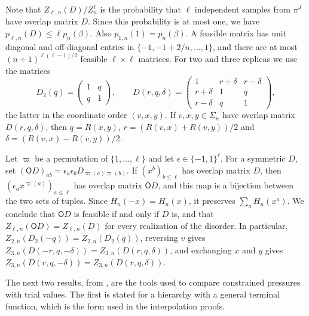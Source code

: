 Note that $Z_{\ell,n}(D)/Z_n^\ell$ is the probability that $\ell$ independent samples
from $\pi^J$ have overlap matrix $D$. Since this probability is at most one, we have
$p_{\ell,n}(D)\le\ell p_n(\beta)$. Also $p_{1,n}(1)=p_n(\beta)$. A feasible matrix has unit diagonal
and off-diagonal entries in $\{-1,-1+2/n,\dots,1\}$, and there are at most
$(n+1)^{\ell(\ell-1)/2}$ feasible $\ell\times\ell$ matrices. For two and three
replicas we use the matrices
\begin{equation}\label{eq:inp-triple}
 D_2(q)=\begin{pmatrix}1&q\\q&1\end{pmatrix},\qquad
 D(r,q,\delta)=\begin{pmatrix}1&r+\delta&r-\delta\\r+\delta&1&q\\r-\delta&q&1\end{pmatrix},
\end{equation}
the latter in the coordinate order $(v,x,y)$. If $v,x,y\in\Sigma_n$ have overlap
matrix $D(r,q,\delta)$, then $q=R(x,y)$, $r=(R(v,x)+R(v,y))/2$ and
$\delta=(R(v,x)-R(v,y))/2$.

\begin{remark}\label{rem:inp-orientation}
Let $\varpi$ be a permutation of $\{1,\dots,\ell\}$ and let
$\epsilon\in\{-1,1\}^\ell$. For a symmetric $D$, set
$(\mathsf O D)_{ab}=\epsilon_a\epsilon_bD_{\varpi(a)\varpi(b)}$. If $(x^b)_{b\le\ell}$ has
overlap matrix $D$, then $(\epsilon_ax^{\varpi(a)})_{a\le\ell}$ has overlap matrix
$\mathsf OD$,
and this map is a bijection between the two sets of tuples. Since
$H_n(-x)=H_n(x)$, it preserves $\sum_aH_n(x^a)$. We conclude that $\mathsf OD$ is
feasible if and only if $D$ is, and that $Z_{\ell,n}(\mathsf OD)=Z_{\ell,n}(D)$ for every
realization of the disorder. In particular, $Z_{2,n}(D_2(-q))=Z_{2,n}(D_2(q))$,
reversing $v$ gives $Z_{3,n}(D(-r,q,-\delta))=Z_{3,n}(D(r,q,\delta))$, and
exchanging $x$ and $y$ gives $Z_{3,n}(D(r,q,-\delta))=Z_{3,n}(D(r,q,\delta))$.
\end{remark}

The next two results, from \cite[Section~2]{oai-barriers}, are the tools used
to compare constrained pressures with trial values. The first is stated for
a hierarchy with a general terminal function, which is the form used in the
interpolation proofs.

